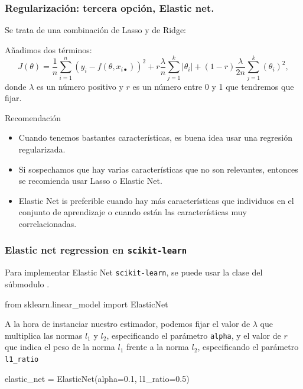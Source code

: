 \documentclass{beamer}
\begin{document}
 \begin{frame}\frametitle{Regularización: tercera opción, Elastic net.}
   \begin{overlayarea}{\textwidth}{\textheight}
     Se trata de una combinación de Lasso y de Ridge:
 \begin{block}{}
 Añadimos dos términos: 
 $$J(\theta)=\frac 1
 n\sum_{i=1}^n\left(y_i-f(\theta,x_{i\bullet})\right)^2 +r  \frac
 \lambda n  \sum_{j=1}^{k}\vert \theta_i\vert + (1 - r)\frac {\lambda} {2n}\sum_{j=1}^{k}( \theta_i)^2,      $$
{\scriptsize donde $\lambda$ es un número positivo y $r$ es un número entre 0 y 1 que tendremos que fijar.   }
\end{block} \scriptsize
\begin{block}{Recomendación}
  \begin{itemize}
  \item    Cuando tenemos bastantes características, es buena idea usar una
   regresión regularizada. 
 \item Si sospechamos que hay varias
   características que no son relevantes, entonces se recomienda usar
   Lasso o Elastic Net.
 \item Elastic Net is preferible cuando hay más características que
   individuos en el conjunto de aprendizaje o cuando están las
   características muy correlacionadas.
  \end{itemize}

 \end{block}

   \end{overlayarea}
 \end{frame}
\begin{frame}[fragile]
   \frametitle{Elastic net regression en {\tt scikit-learn}}
   \begin{overlayarea}{\textwidth}{\textheight} 
   Para implementar Elastic Net {\tt scikit-learn}, se puede
   usar la clase  del súbmodulo .
   \begin{pyverbatim}
from sklearn.linear_model import ElasticNet
\end{pyverbatim}
\medskip

A la hora de instanciar nuestro estimador, podemos fijar el valor de
$\lambda$ que multiplica las normas $l_1$ y $l_2$, especificando el parámetro
{\tt alpha}, y el valor de $r$ que indica el peso de la norma $l_1$
frente  a la norma $l_2$, especificando el parámetro {\tt l1\_ratio}
\begin{pyverbatim}
elastic_net = ElasticNet(alpha=0.1, l1_ratio=0.5)  
\end{pyverbatim}
\end{overlayarea}   
\end{frame}
\end{document}
